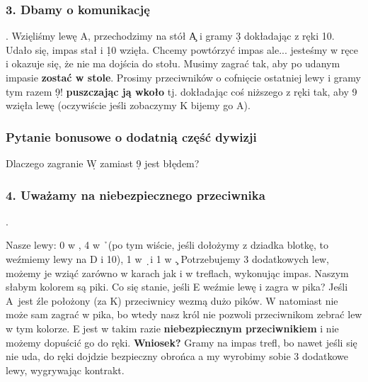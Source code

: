 \documentclass{article}
\begin{document}
\subsubsection*{3. Dbamy o komunikację}.
Wzięliśmy lewę \s A, przechodzimy na stół \c A i gramy \d 3 dokładając z ręki 10. Udało się, impas stał i \d 10 wzięła.
Chcemy powtórzyć impas ale... jesteśmy w ręce i okazuje się, że nie ma dojścia do stołu. Musimy zagrać tak, aby po
udanym impasie \textbf{zostać w stole}. Prosimy przeciwników o cofnięcie ostatniej lewy i gramy tym razem \d 9!
\textbf{puszczając ją wkoło} tj. dokładając coś niższego z ręki tak, aby 9 wzięła lewę (oczywiście jeśli zobaczymy
K bijemy go A).
\subsubsection*{Pytanie bonusowe o dodatnią część dywizji}
Dlaczego zagranie \d W zamiast \d 9 jest błędem?
\subsubsection*{4. Uważamy na niebezpiecznego przeciwnika}.
\begin{quote}
\end{quote}
Nasze lewy: 0 w \s, 4 w \h\ (po tym wiście, jeśli dołożymy z dziadka blotkę, to weźmiemy lewy na D i 10), 1 w \d\ 
i 1 w \c. Potrzebujemy 3 dodatkowych lew, możemy je wziąć zarówno w karach jak i w treflach, wykonując impas. Naszym
słabym kolorem są piki. Co się stanie, jeśli E weźmie lewę i zagra w pika? Jeśli A\s\ jest źle położony (za K)
przeciwnicy wezmą dużo pików. W natomiast nie może sam zagrać w pika, bo wtedy nasz król nie pozwoli przeciwnikom
zebrać lew w tym kolorze. E jest w takim razie \textbf{niebezpiecznym przeciwnikiem} i nie możemy dopuścić go do ręki.
\textbf{Wniosek?} Gramy na impas trefl, bo nawet jeśli się nie uda, do ręki dojdzie bezpieczny obrońca a my wyrobimy
sobie 3 dodatkowe lewy, wygrywając kontrakt.
\end{document}
